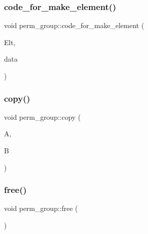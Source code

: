 \mbox{\label{classperm__group_ac4de1482959a2701ebd10c75bb5c9f86}} 
\subsubsection{\texorpdfstring{code\+\_\+for\+\_\+make\+\_\+element()}{code\_for\_make\_element()}}
{\footnotesize\ttfamily void perm\+\_\+group\+::code\+\_\+for\+\_\+make\+\_\+element (\begin{DoxyParamCaption}\item[{\mbox{\hyperlink{galois_8h_a09fddde158a3a20bd2dcadb609de11dc}{I\+NT}} $\ast$}]{Elt,  }\item[{\mbox{\hyperlink{galois_8h_a09fddde158a3a20bd2dcadb609de11dc}{I\+NT}} $\ast$}]{data }\end{DoxyParamCaption})}

\mbox{\label{classperm__group_aeb250cf88ebc1ac4ff44f207ecedbd53}} 
\subsubsection{\texorpdfstring{copy()}{copy()}}
{\footnotesize\ttfamily void perm\+\_\+group\+::copy (\begin{DoxyParamCaption}\item[{\mbox{\hyperlink{galois_8h_a09fddde158a3a20bd2dcadb609de11dc}{I\+NT}} $\ast$}]{A,  }\item[{\mbox{\hyperlink{galois_8h_a09fddde158a3a20bd2dcadb609de11dc}{I\+NT}} $\ast$}]{B }\end{DoxyParamCaption})}

\mbox{\label{classperm__group_a07c6076d33cda4233128ace0cb4dcb19}} 
\subsubsection{\texorpdfstring{free()}{free()}}
{\footnotesize\ttfamily void perm\+\_\+group\+::free (\begin{DoxyParamCaption}{ }\end{DoxyParamCaption})}

